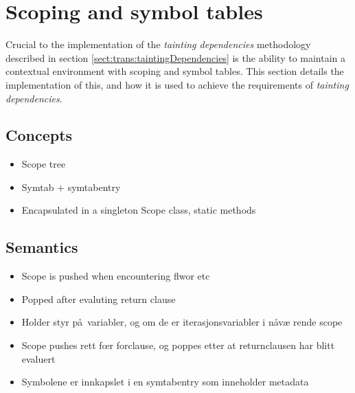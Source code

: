 \section{Scoping and symbol tables}
Crucial to the implementation of the \textit{tainting dependencies} methodology
described in section \ref{sect:trans:taintingDependencies} is the ability to
maintain a contextual environment with scoping and symbol tables. This section
details the implementation of this, and how it is used to achieve the
requirements of \textit{tainting dependencies}.

\subsection{Concepts}
\begin{itemize}
  \item Scope tree
  \item Symtab + symtabentry
  \item Encapsulated in a singleton Scope class, static methods
\end{itemize}

\subsection{Semantics}
\begin{itemize}
  \item Scope is pushed when encountering flwor etc
  \item Popped after evaluting return clause
\end{itemize}

\begin{itemize}
  \item Holder styr p\aa~variabler, og om de er iterasjonsvariabler i n\aa v\ae
  rende scope
  \item Scope pushes rett f\oe r forclause, og poppes etter at returnclausen har
  blitt evaluert
  \item Symbolene er innkapslet i en symtabentry som inneholder metadata
\end{itemize}